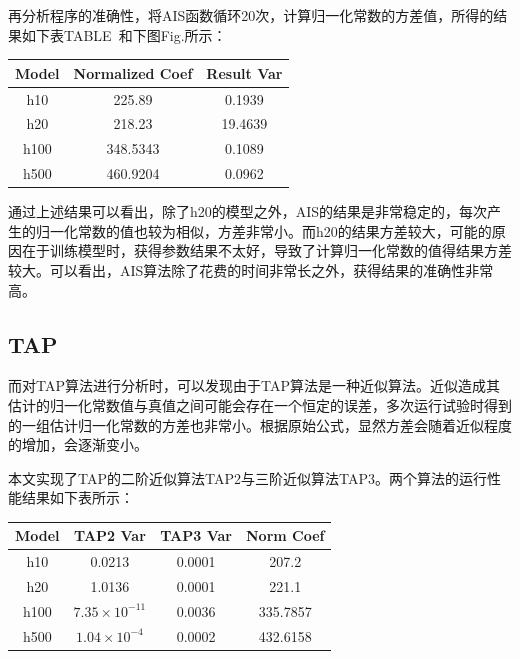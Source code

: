 \documentclass[journal,a4paper]{IEEEtran}
\begin{document}
		再分析程序的准确性，将AIS函数循环20次，计算归一化常数的方差值，所得的结果如下表TABLE~和下图Fig.所示：
		\begin{tabular}{c|cc}
			\hline
			Model & Normalized Coef& Result Var \\
			\hline
			h10 & 225.89 & 0.1939 \\
			h20 & 218.23 & 19.4639 \\
			h100 & 348.5343 & 0.1089 \\
			h500 & 460.9204 & 0.0962\\
			\hline
		\end{tabular}

		通过上述结果可以看出，除了h20的模型之外，AIS的结果是非常稳定的，每次产生的归一化常数的值也较为相似，方差非常小。而h20的结果方差较大，可能的原因在于训练模型时，获得参数结果不太好，导致了计算归一化常数的值得结果方差较大。可以看出，AIS算法除了花费的时间非常长之外，获得结果的准确性非常高。

	\subsection{TAP}
		而对TAP算法进行分析时，可以发现由于TAP算法是一种近似算法。近似造成其估计的归一化常数值与真值之间可能会存在一个恒定的误差，多次运行试验时得到的一组估计归一化常数的方差也非常小。根据原始公式，显然方差会随着近似程度的增加，会逐渐变小。
		
		本文实现了TAP的二阶近似算法TAP2与三阶近似算法TAP3。两个算法的运行性能结果如下表所示：
		\begin{tabular}{c|ccc}
			\hline
			Model & TAP2 Var & TAP3 Var & Norm Coef\\
			\hline
			h10 & 0.0213 & 0.0001 & 207.2 \\
			h20 & 1.0136 & 0.0001 & 221.1 \\
			h100 & $7.35\times 10^{-11}$ & 0.0036 & 335.7857 \\
			h500 & $1.04\times 10^{-4}$ & 0.0002 & 432.6158 \\
			\hline
		\end{tabular}
	
\end{document}
